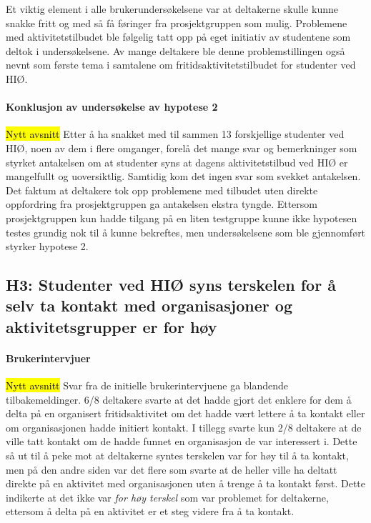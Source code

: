Et viktig element i alle brukerundersøkelsene var at deltakerne skulle kunne snakke fritt og med så få føringer fra prosjektgruppen som mulig. Problemene med aktivitetstilbudet ble følgelig tatt opp på eget initiativ av studentene som deltok i undersøkelsene. Av mange deltakere ble denne problemstillingen også nevnt som første tema i samtalene om fritidsaktivitetstilbudet for studenter ved HIØ.

\paragraph{Konklusjon av undersøkelse av hypotese 2}
\hl{Nytt avsnitt}
Etter å ha snakket med til sammen 13 forskjellige studenter ved HIØ, noen av dem i flere omganger, forelå det mange svar og bemerkninger som styrket antakelsen om at studenter syns at dagens aktivitetstilbud ved HIØ er mangelfullt og uoversiktlig. Samtidig kom det ingen svar som svekket antakelsen. Det faktum at deltakere tok opp problemene med tilbudet uten direkte oppfordring fra prosjektgruppen ga antakelsen ekstra tyngde. Ettersom prosjektgruppen kun hadde tilgang på en liten testgruppe kunne ikke hypotesen testes grundig nok til å kunne bekreftes, men undersøkelsene som ble gjennomført styrker hypotese 2.

\subsection{H3: Studenter ved HIØ syns terskelen for å selv ta kontakt med organisasjoner og aktivitetsgrupper er for høy}

\paragraph{Brukerintervjuer}
\hl{Nytt avsnitt}
Svar fra de initielle brukerintervjuene ga blandende tilbakemeldinger. 6/8 deltakere svarte at det hadde gjort det enklere for dem å delta på en organisert fritidsaktivitet om det hadde vært lettere å ta kontakt eller om organisasjonen hadde initiert kontakt. I tillegg svarte kun 2/8 deltakere at de ville tatt kontakt om de hadde funnet en organisasjon de var interessert i. Dette så ut til å peke mot at deltakerne syntes terskelen var for høy til å ta kontakt, men på den andre siden var det flere som svarte at de heller ville ha deltatt direkte på en aktivitet med organisasjonen uten å trenge å ta kontakt først. Dette indikerte at det ikke var {\em for høy terskel} som var problemet for deltakerne, ettersom å delta på en aktivitet er et steg videre fra å ta kontakt.

